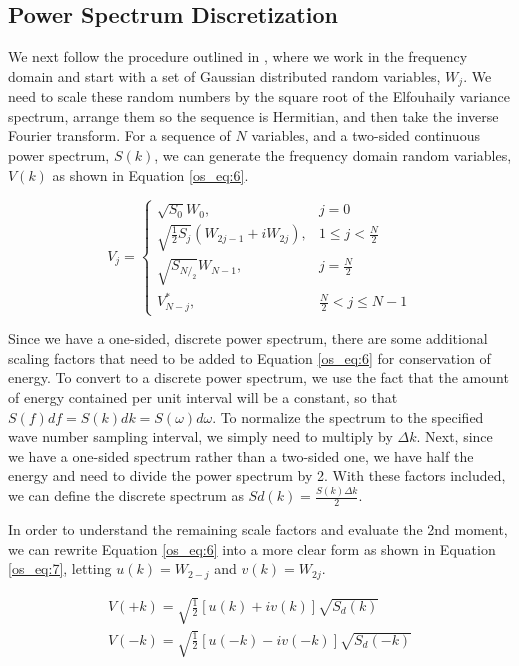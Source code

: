 \subsection{Power Spectrum Discretization}

We next follow the procedure outlined in \cite{percival_spectra},  where we work in the frequency domain and start with a set of Gaussian distributed random variables, $W_j$. We need to scale these random numbers by the square root of the Elfouhaily variance spectrum, arrange them so the sequence is Hermitian, and then take the inverse Fourier transform. For a sequence of $N$ variables, and a two-sided continuous power spectrum, $S(k)$, we can generate the frequency domain random variables, $V(k)$ as shown in Equation \ref{os_eq:6}.

\begin{equation}
  \label{os_eq:6}   
  V_j = \begin{cases}
    \sqrt{S_0}W_0, & j = 0 \\
    \sqrt{\frac{1}{2}S_j}\left(W_{2j-1} + iW_{2j} \right), & 1 \leq j <\frac{N}{2} \\
    \sqrt{S_{N/_2}}W_{N-1}, & j = \frac{N}{2} \\
    V_{N-j}^*, &  \frac{N}{2} < j \leq N-1 
  \end{cases} 
\end{equation}

Since we have a one-sided, discrete power spectrum, there are some additional scaling factors that need to be added to Equation \ref{os_eq:6} for conservation of energy. To convert to a discrete power spectrum, we use the fact that the amount of energy contained per unit interval will be a constant, so that $S(f)df = S(k)dk = S(\omega) d\omega$. To normalize the spectrum to the specified wave number sampling interval, we simply need to multiply by $\Delta k$. Next, since we have a one-sided spectrum rather than a two-sided one, we have half the energy and need to divide the power spectrum by 2. With these factors included, we can define the discrete spectrum as $Sd(k) = \frac{S(k)\Delta k}{2}$.

In order to understand the remaining scale factors and evaluate the 2nd moment, we can rewrite Equation \ref{os_eq:6} into a more clear form as shown in Equation \ref{os_eq:7}, letting $u(k) = W_{2-j}$ and $v(k) = W_{2j}$.

\begin{equation}
  \begin{gathered}
  \label{os_eq:7}
  V(+k) = \sqrt{\frac{1}{2}}\left[u(k) + iv(k) \right]\sqrt{S_d(k)} \\
  V(-k) = \sqrt{\frac{1}{2}}\left[u(-k) - iv(-k) \right]\sqrt{S_d(-k)}
  \end{gathered}
\end{equation}

